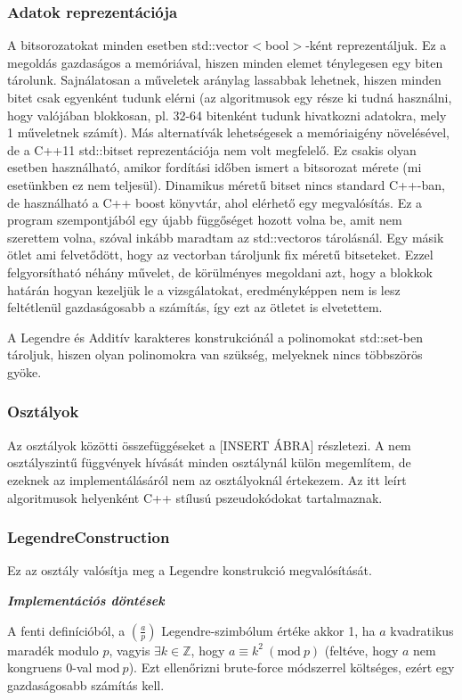 \documentclass[12pt]{article}
\begin{document}
\subsubsection{Adatok reprezentációja}
A bitsorozatokat minden esetben std::vector$<$bool$>$-ként reprezentáljuk. Ez a megoldás gazdaságos a memóriával, hiszen minden elemet ténylegesen egy biten tárolunk. Sajnálatosan a műveletek aránylag lassabbak lehetnek, hiszen minden bitet csak egyenként tudunk elérni (az algoritmusok egy része ki tudná használni, hogy valójában blokkosan, pl. 32-64 bitenként tudunk hivatkozni adatokra, mely 1 műveletnek számít). Más alternatívák lehetségesek a memóriaigény növelésével, de a C++11 std::bitset reprezentációja nem volt megfelelő. Ez csakis olyan esetben használható, amikor fordítási időben ismert a bitsorozat mérete (mi esetünkben ez nem teljesül). Dinamikus méretű bitset nincs standard C++-ban, de használható a C++ boost könyvtár, ahol elérhető egy megvalósítás. Ez a program szempontjából egy újabb függőséget hozott volna be, amit nem szerettem volna, szóval inkább maradtam az std::vectoros tárolásnál. Egy másik ötlet ami felvetődött, hogy az vectorban tároljunk fix méretű bitseteket. Ezzel felgyorsítható néhány művelet, de körülményes megoldani azt, hogy a blokkok határán hogyan kezeljük le a vizsgálatokat, eredményképpen nem is lesz feltétlenül gazdaságosabb a számítás, így ezt az ötletet is elvetettem.

A Legendre és Additív karakteres konstrukciónál a polinomokat std::set-ben tároljuk, hiszen olyan polinomokra van szükség, melyeknek nincs többszörös gyöke.
\subsubsection{Osztályok}
Az osztályok közötti összefüggéseket a [INSERT ÁBRA] részletezi. A nem osztályszintű függvények hívását minden osztálynál külön megemlítem, de ezeknek az implementálásáról nem az osztályoknál értekezem. Az itt leírt algoritmusok helyenként C++ stílusú pszeudokódokat tartalmaznak.
\subsubsection*{LegendreConstruction}
Ez az osztály valósítja meg a Legendre konstrukció megvalósítását.

\textbf{\textit{Implementációs döntések}}

A fenti definícióból, a $\left({\frac{a}{p}}\right)$ Legendre-szimbólum értéke akkor 1, ha $a$ kvadratikus maradék modulo $p$, vagyis $\exists k \in \mathbb{Z}$, hogy $a \equiv k^2\ (\textrm{mod}\ p)$ (feltéve, hogy $a$ nem kongruens 0-val $\textrm{mod}\ p$). Ezt ellenőrizni brute-force módszerrel költséges, ezért egy gazdaságosabb számítás kell.
\end{document}
